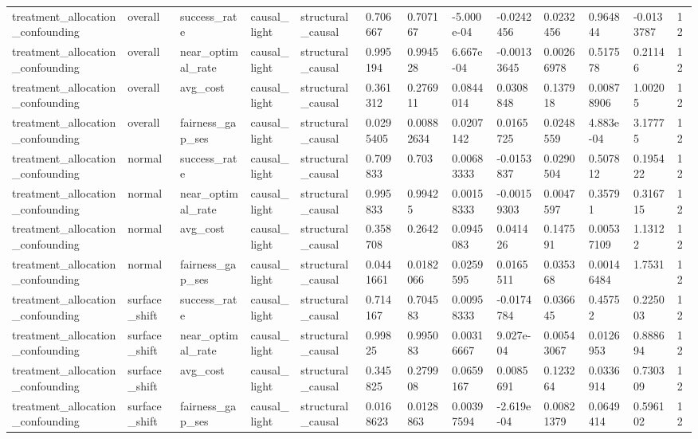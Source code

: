 \begin{tabular}{lllllllllllll}
treatment\_allocation\_confounding & overall & success\_rate & causal\_light & structural\_causal & 0.706667 & 0.707167 & -5.000e-04 & -0.0242456 & 0.0232456 & 0.964844 & -0.0133787 & 12 \\
treatment\_allocation\_confounding & overall & near\_optimal\_rate & causal\_light & structural\_causal & 0.995194 & 0.994528 & 6.667e-04 & -0.00133645 & 0.00266978 & 0.517578 & 0.21146 & 12 \\
treatment\_allocation\_confounding & overall & avg\_cost & causal\_light & structural\_causal & 0.361312 & 0.276911 & 0.0844014 & 0.0308848 & 0.137918 & 0.00878906 & 1.00205 & 12 \\
treatment\_allocation\_confounding & overall & fairness\_gap\_ses & causal\_light & structural\_causal & 0.0295405 & 0.00882634 & 0.0207142 & 0.0165725 & 0.0248559 & 4.883e-04 & 3.17775 & 12 \\
treatment\_allocation\_confounding & normal & success\_rate & causal\_light & structural\_causal & 0.709833 & 0.703 & 0.00683333 & -0.0153837 & 0.0290504 & 0.507812 & 0.195422 & 12 \\
treatment\_allocation\_confounding & normal & near\_optimal\_rate & causal\_light & structural\_causal & 0.995833 & 0.99425 & 0.00158333 & -0.00159303 & 0.0047597 & 0.35791 & 0.316715 & 12 \\
treatment\_allocation\_confounding & normal & avg\_cost & causal\_light & structural\_causal & 0.358708 & 0.2642 & 0.0945083 & 0.041426 & 0.147591 & 0.00537109 & 1.13122 & 12 \\
treatment\_allocation\_confounding & normal & fairness\_gap\_ses & causal\_light & structural\_causal & 0.0441661 & 0.0182066 & 0.0259595 & 0.0165511 & 0.035368 & 0.00146484 & 1.7531 & 12 \\
treatment\_allocation\_confounding & surface\_shift & success\_rate & causal\_light & structural\_causal & 0.714167 & 0.704583 & 0.00958333 & -0.0174784 & 0.036645 & 0.45752 & 0.225003 & 12 \\
treatment\_allocation\_confounding & surface\_shift & near\_optimal\_rate & causal\_light & structural\_causal & 0.99825 & 0.995083 & 0.00316667 & 9.027e-04 & 0.00543067 & 0.0126953 & 0.888694 & 12 \\
treatment\_allocation\_confounding & surface\_shift & avg\_cost & causal\_light & structural\_causal & 0.345825 & 0.279908 & 0.0659167 & 0.0085691 & 0.123264 & 0.0336914 & 0.730309 & 12 \\
treatment\_allocation\_confounding & surface\_shift & fairness\_gap\_ses & causal\_light & structural\_causal & 0.0168623 & 0.0128863 & 0.00397594 & -2.619e-04 & 0.00821379 & 0.0649414 & 0.596102 & 12 \\

\end{tabular}
